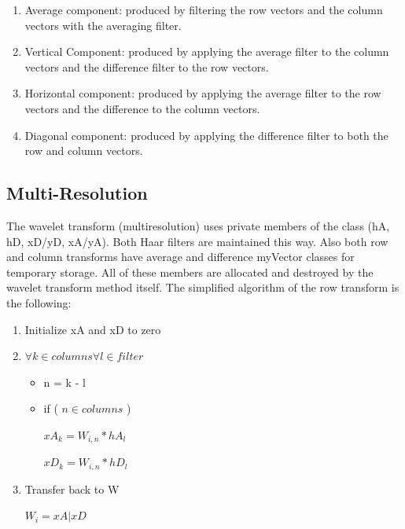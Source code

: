 \documentclass[11pt]{article}
\begin{document}
\begin{enumerate}
\subsection{2-D Storage Method}
The matrix form below is chosen for its simplicity:

$\qquad B\Rightarrow 
\begin{tabular}{ll}
$A$ & $V$ \\ 
$H$ & $D$%
\end{tabular}
$

begin{enumerate}
\item Average component: produced by filtering the row vectors and the column vectors with the averaging filter.
\item Vertical Component:  produced by applying the average filter to the column vectors and the difference filter to the row vectors.
\item Horizontal component: produced by applying the average filter to the row vectors and the difference to the column vectors.
\item Diagonal component: produced by applying the difference filter to both the row and column vectors.  
\end{enumerate}

\newpage
\subsection {Multi-Resolution}

The wavelet transform (multiresolution) uses private members of the class (hA, hD, xD/yD, xA/yA).  Both Haar filters are maintained this way.  Also both row and column transforms have average and difference myVector classes for temporary storage.   All of these members are allocated and destroyed by the wavelet transform method itself.   The simplified algorithm of the row transform is the following:
\begin{enumerate}
\item Initialize xA and xD to zero
\item $\forall k \in columns \forall l \in filter$
\begin{itemize}
\item n = k - l
\item if ( $n \in columns $ )

	$xA_k = W_{i,n} * hA_l $
	
	$xD_k = W_{i,n} * hD_l $
	
	
\end{itemize}
\item Transfer back to W

	$W_i = xA|xD $
\end{enumerate}
\end{document}
